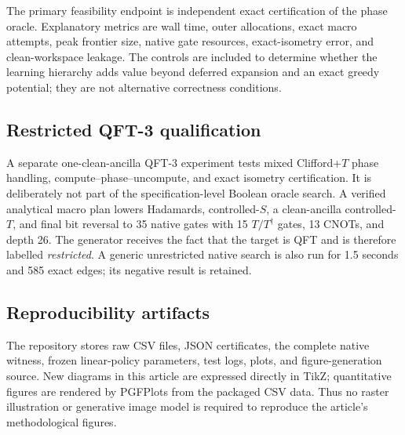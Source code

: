 The primary feasibility endpoint is independent exact certification of the phase oracle.  Explanatory metrics are wall time, outer allocations, exact macro attempts, peak frontier size, native gate resources, exact-isometry error, and clean-workspace leakage.  The controls are included to determine whether the learning hierarchy adds value beyond deferred expansion and an exact greedy potential; they are not alternative correctness conditions.

\subsection{Restricted QFT-3 qualification}

A separate one-clean-ancilla QFT-3 experiment tests mixed Clifford+$T$ phase handling, compute--phase--uncompute, and exact isometry certification.  It is deliberately not part of the specification-level Boolean oracle search.  A verified analytical macro plan lowers Hadamards, controlled-$S$, a clean-ancilla controlled-$T$, and final bit reversal to 35 native gates with 15 $T/T^\dagger$ gates, 13 CNOTs, and depth 26.  The generator receives the fact that the target is QFT and is therefore labelled \emph{restricted}.  A generic unrestricted native search is also run for 1.5 seconds and 585 exact edges; its negative result is retained.

\subsection{Reproducibility artifacts}

The repository stores raw CSV files, JSON certificates, the complete native witness, frozen linear-policy parameters, test logs, plots, and figure-generation source.  New diagrams in this article are expressed directly in TikZ; quantitative figures are rendered by PGFPlots from the packaged CSV data.  Thus no raster illustration or generative image model is required to reproduce the article's methodological figures.
